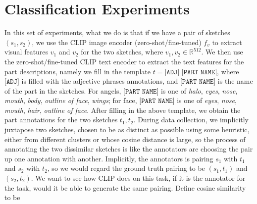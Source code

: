 
\section{Classification Experiments}
In this set of experiments, what we do is that if we have a pair of sketches $(s_1,s_2)$, we use the CLIP image encoder (zero-shot/fine-tuned) $f_v$ to extract visual features $v_1$ and $v_2$ for the two sketches, where $v_1,v_2 \in \mathbb{R}^{512}$. We then use the zero-shot/fine-tuned CLIP text encoder to extract the text features for the part descriptions, namely we fill in the template $t = \texttt{[ADJ] [PART NAME]}$, where $\texttt{[ADJ]}$ is filled with the adjective phrases annotations, and $\texttt{[PART NAME]}$ is the name of the part in the sketches. For angels, $\texttt{[PART NAME]}$ is one of \textit{halo}, \textit{eyes}, \textit{nose}, \textit{mouth}, \textit{body}, \textit{outline of face}, \textit{wings}; for face, $\texttt{[PART NAME]}$ is one of \textit{eyes}, \textit{nose}, \textit{mouth}, \textit{hair}, \textit{outline of face}. After filling in the above template, we obtain the part annotations for the two sketches $t_1,t_2$.  
During data collection, we implicitly juxtapose two sketches, chosen to be as distinct as possible using some heuristic, either from different clusters or whose cosine distance is large, so the process of annotating the two dissimilar sketches is like the annotators are choosing the pair up one annotation with another. Implicitly, the annotators is pairing $s_1$ with $t_1$ and $s_2$ with $t_2$, so we would regard the ground truth pairing to be $(s_1,t_1)$ and $(s_2,t_2)$. We want to see how CLIP does on this task, if it is the annotator for the task, would it be able to generate the same pairing. Define cosine similarity to be        




